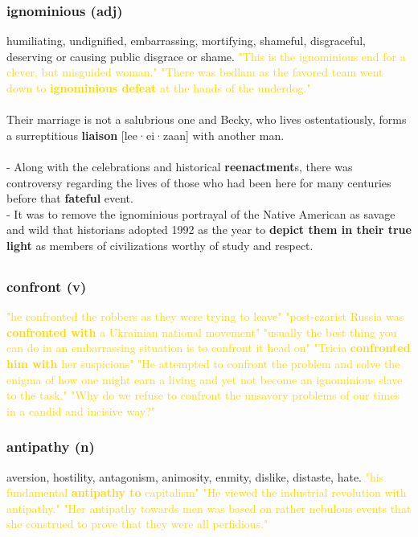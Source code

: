 \documentclass{proc}
\begin{document}
	\subsubsection{\textcolor{brickred}{ignominious} (adj)}
	humiliating,
	undignified,
	embarrassing,
	mortifying,
	shameful,
	disgraceful, deserving or causing public disgrace or shame.
	\textcolor{gold}{"This is the ignominious end for a clever, but misguided woman." "There was bedlam as the favored team went down to \textbf{ignominious defeat}
		at the hands of the underdog."}\\\\
	Their 
	marriage is not a salubrious one and Becky, who lives 
	ostentatiously, forms a surreptitious \textbf{liaison} [lee·ei·zaan] with another 
	man.\\\\
	- Along with the celebrations and historical 
	\textbf{reenactment}s, there was controversy regarding the lives of those who had 
	been here for many centuries before that \textbf{fateful} event.\\
	- It was to remove the ignominious portrayal of the Native American as savage 
	and wild that historians adopted 1992 as the year to \textbf{depict them in 
	their true light} as members of civilizations worthy of study and respect.
	
	\newpage
	\setcounter{section}{37}
	\setcounter{subsection}{0}
	
	
	\subsection{}
	\subsubsection{\textcolor{brickred}{confront} (v)}
	
	\textcolor{gold}{"he confronted the robbers as they were trying to leave" "post-czarist Russia was \textbf{confronted with} a Ukrainian national movement" "usually the best thing you can do in an embarrassing situation is to confront it head on" "Tricia \textbf{confronted him with} her suspicions" "He attempted to confront the problem and solve 
		the enigma of how one might earn a living and yet not 
		become an ignominious slave to the task." "Why do we refuse to confront the unsavory problems of our times in a 
		candid and incisive way?"}
	
	\subsubsection{\textcolor{brickred}{antipathy} (n)}
	aversion,
	hostility,
	antagonism,
	animosity,
	enmity, dislike, distaste, hate.
	\textcolor{gold}{"his fundamental \textbf{antipathy to} capitalism" "He viewed the 
		industrial revolution with antipathy." "Her antipathy towards men was based on rather nebulous events that she 
		construed to prove that they were all perfidious."}
	
\end{document}
